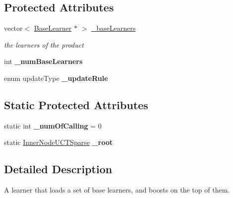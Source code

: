 \subsection*{Protected Attributes}
\begin{DoxyCompactItemize}
\item 
\hypertarget{classMultiBoost_1_1ProductLearnerUCT_a08ef279f628d491e9762849095af6519}{
vector$<$ \hyperlink{classMultiBoost_1_1BaseLearner}{BaseLearner} $\ast$ $>$ \hyperlink{classMultiBoost_1_1ProductLearnerUCT_a08ef279f628d491e9762849095af6519}{\_\-baseLearners}}
\label{classMultiBoost_1_1ProductLearnerUCT_a08ef279f628d491e9762849095af6519}

\begin{DoxyCompactList}\small\item\em the learners of the product \end{DoxyCompactList}\item 
\hypertarget{classMultiBoost_1_1ProductLearnerUCT_a6a26a3036d410051845bbbdd44629b80}{
int {\bfseries \_\-numBaseLearners}}
\label{classMultiBoost_1_1ProductLearnerUCT_a6a26a3036d410051845bbbdd44629b80}

\item 
\hypertarget{classMultiBoost_1_1ProductLearnerUCT_a4032c2620ac5ed61d3238df52a37265c}{
enum updateType {\bfseries \_\-updateRule}}
\label{classMultiBoost_1_1ProductLearnerUCT_a4032c2620ac5ed61d3238df52a37265c}

\end{DoxyCompactItemize}
\subsection*{Static Protected Attributes}
\begin{DoxyCompactItemize}
\item 
\hypertarget{classMultiBoost_1_1ProductLearnerUCT_a6dd61198d87c8ece883c46eaf383a0f0}{
static int {\bfseries \_\-numOfCalling} = 0}
\label{classMultiBoost_1_1ProductLearnerUCT_a6dd61198d87c8ece883c46eaf383a0f0}

\item 
\hypertarget{classMultiBoost_1_1ProductLearnerUCT_aea4edf5b7d2c80496f61a725bf792e53}{
static \hyperlink{classMultiBoost_1_1InnerNodeUCTSparse}{InnerNodeUCTSparse} {\bfseries \_\-root}}
\label{classMultiBoost_1_1ProductLearnerUCT_aea4edf5b7d2c80496f61a725bf792e53}

\end{DoxyCompactItemize}


\subsection{Detailed Description}
A learner that loads a set of base learners, and boosts on the top of them. 

